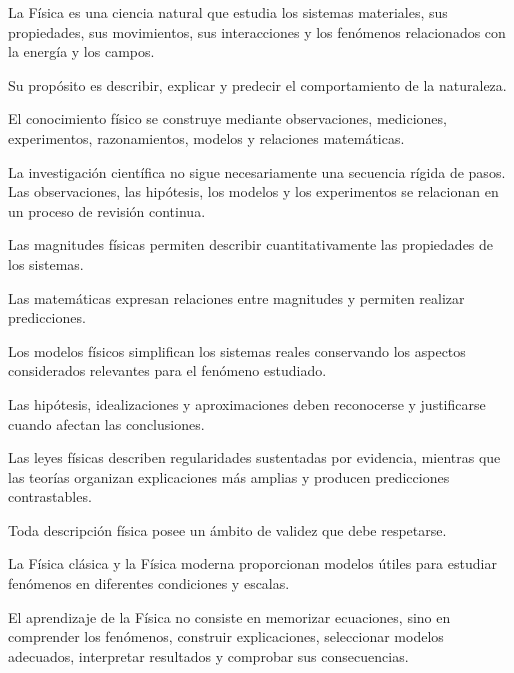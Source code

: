 \begin{resumen}

La Física es una ciencia natural que estudia
los sistemas materiales, sus propiedades,
sus movimientos, sus interacciones
y los fenómenos relacionados con
la energía y los campos.

Su propósito es describir, explicar
y predecir el comportamiento
de la naturaleza.

El conocimiento físico se construye
mediante observaciones, mediciones,
experimentos, razonamientos,
modelos y relaciones matemáticas.

La investigación científica
no sigue necesariamente una secuencia
rígida de pasos. Las observaciones,
las hipótesis, los modelos
y los experimentos se relacionan
en un proceso de revisión continua.

Las magnitudes físicas permiten
describir cuantitativamente
las propiedades de los sistemas.

Las matemáticas expresan relaciones
entre magnitudes y permiten
realizar predicciones.

Los modelos físicos simplifican
los sistemas reales conservando
los aspectos considerados relevantes
para el fenómeno estudiado.

Las hipótesis, idealizaciones
y aproximaciones deben reconocerse
y justificarse cuando afectan
las conclusiones.

Las leyes físicas describen
regularidades sustentadas por evidencia,
mientras que las teorías organizan
explicaciones más amplias
y producen predicciones contrastables.

Toda descripción física posee
un ámbito de validez
que debe respetarse.

La Física clásica y la Física moderna
proporcionan modelos útiles
para estudiar fenómenos
en diferentes condiciones y escalas.

El aprendizaje de la Física
no consiste en memorizar ecuaciones,
sino en comprender los fenómenos,
construir explicaciones,
seleccionar modelos adecuados,
interpretar resultados
y comprobar sus consecuencias.

\end{resumen}